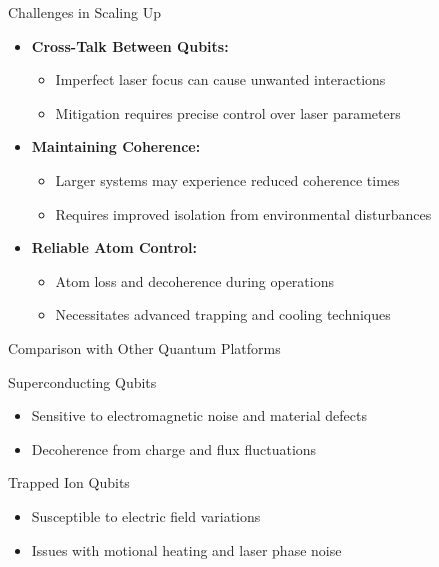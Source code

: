\begin{frame}{Challenges in Scaling Up}
  \begin{itemize}
    \item \textbf{Cross-Talk Between Qubits:}
      \begin{itemize}
        \item Imperfect laser focus can cause unwanted interactions
        \item Mitigation requires precise control over laser parameters
      \end{itemize}
    \item \textbf{Maintaining Coherence:}
      \begin{itemize}
        \item Larger systems may experience reduced coherence times
        \item Requires improved isolation from environmental disturbances
      \end{itemize}
    \item \textbf{Reliable Atom Control:}
      \begin{itemize}
        \item Atom loss and decoherence during operations
        \item Necessitates advanced trapping and cooling techniques
      \end{itemize}
  \end{itemize}
\end{frame}
\begin{frame}{Comparison with Other Quantum Platforms}
    \begin{block}{Superconducting Qubits}
        \begin{itemize}
            \item Sensitive to electromagnetic noise and material defects
            \item Decoherence from charge and flux fluctuations
        \end{itemize}
    \end{block}
    \begin{block}{Trapped Ion Qubits}
        \begin{itemize}
            \item Susceptible to electric field variations
            \item Issues with motional heating and laser phase noise
        \end{itemize}
    \end{block}
\end{frame}

